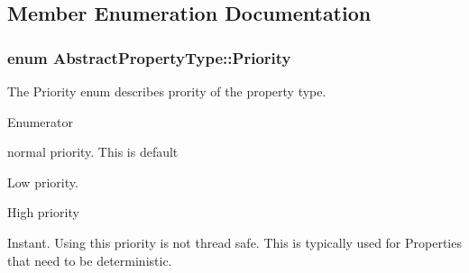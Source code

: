 \subsection{Member Enumeration Documentation}
\hypertarget{classAbstractPropertyType_a1e513f66eb2dd2bd2cddbec16422af63}{
\subsubsection[{Priority}]{\setlength{\rightskip}{0pt plus 5cm}enum {\bf Abstract\+Property\+Type\+::\+Priority}}}\label{classAbstractPropertyType_a1e513f66eb2dd2bd2cddbec16422af63}


The Priority enum describes prority of the property type. 

\begin{Desc}
\item[Enumerator]\par
\begin{description}
\item[{\em 
\hypertarget{classAbstractPropertyType_a1e513f66eb2dd2bd2cddbec16422af63a3412bc77a6a781fb4a832059f1fe5d9a}{Normal}\label{classAbstractPropertyType_a1e513f66eb2dd2bd2cddbec16422af63a3412bc77a6a781fb4a832059f1fe5d9a}
}]normal priority. This is default \item[{\em 
\hypertarget{classAbstractPropertyType_a1e513f66eb2dd2bd2cddbec16422af63a611e6f3b55352cad8a1602ec8cb3c505}{Low}\label{classAbstractPropertyType_a1e513f66eb2dd2bd2cddbec16422af63a611e6f3b55352cad8a1602ec8cb3c505}
}]Low priority. \item[{\em 
\hypertarget{classAbstractPropertyType_a1e513f66eb2dd2bd2cddbec16422af63aabbaad7e0356d6929119fc0e17aa6ad0}{High}\label{classAbstractPropertyType_a1e513f66eb2dd2bd2cddbec16422af63aabbaad7e0356d6929119fc0e17aa6ad0}
}]High priority \item[{\em 
\hypertarget{classAbstractPropertyType_a1e513f66eb2dd2bd2cddbec16422af63a5ef5703d3d1af9d204d6d2f3cf41569a}{Instant}\label{classAbstractPropertyType_a1e513f66eb2dd2bd2cddbec16422af63a5ef5703d3d1af9d204d6d2f3cf41569a}
}]Instant. Using this priority is not thread safe. This is typically used for Properties that need to be deterministic. \end{description}
\end{Desc}


